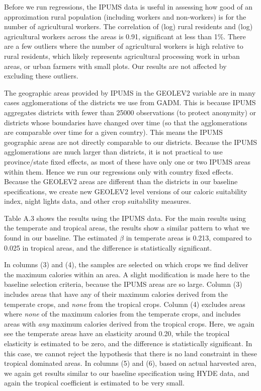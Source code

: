 \documentclass[11pt]{article}
\begin{document}
Before we run regressions, the IPUMS data is useful in assessing how good of an approximation rural population (including workers and non-workers) is for the number of agricultural workers. The correlation of (log) rural residents and (log) agricultural workers across the areas is 0.91, significant at less than 1\%. There are a few outliers where the number of agricultural workers is high relative to rural residents, which likely represents agricultural processing work in urban areas, or urban farmers with small plots. Our results are not affected by excluding these outliers.

The geographic areas provided by IPUMS in the GEOLEV2 variable are in many cases agglomerations of the districts we use from GADM. This is because IPUMS aggregates districts with fewer than 25000 observations (to protect anonymity) or districts whose boundaries have changed over time (so that the agglomerations are comparable over time for a given country). This means the IPUMS geographic areas are not directly comparable to our districts. Because the IPUMS agglomerations are much larger than districts, it is not practical to use province/state fixed effects, as most of these have only one or two IPUMS areas within them. Hence we run our regressions only with country fixed effects. Because the GEOLEV2 areas are different than the districts in our baseline specifications, we create new GEOLEV2 level versions of our caloric suitability index, night lights data, and other crop suitability measures. 

Table A.3 shows the results using the IPUMS data. For the main results using the temperate and tropical areas, the results show a similar pattern to what we found in our baseline. The estimated $\beta$ in temperate areas is 0.213, compared to 0.025 in tropical areas, and the difference is statistically significant. 

In columns (3) and (4), the samples are selected on which crops we find deliver the maximum calories within an area. A slight modification is made here to the baseline selection criteria, because the IPUMS areas are so large. Column (3) includes areas that have any of their maximum calories derived from the temperate crops, and \textit{none} from the tropical crops. Column (4) excludes areas where \textit{none} of the maximum calories from the temperate crops, and includes areas with \textit{any} maximum calories derived from the tropical crops. Here, we again see the temperate areas have an elasticity around 0.20, while the tropical elasticity is estimated to be zero, and the difference is statistically significant. In this case, we cannot reject the hypothesis that there is no land constraint in these tropical dominated areas. In columns (5) and (6), based on actual harvested area, we again get results similar to our baseline specification using HYDE data, and again the tropical coefficient is estimated to be very small. 
\end{document}

